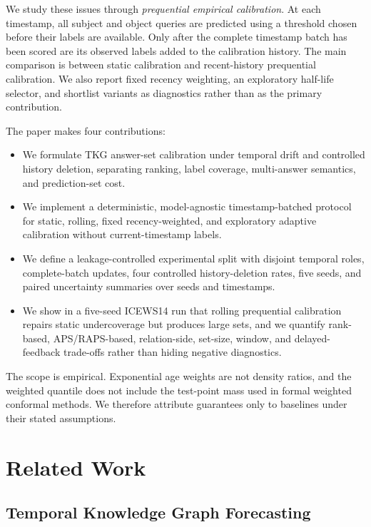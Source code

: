 \documentclass[10pt,twocolumn]{article}
\begin{document}
We study these issues through \emph{prequential empirical calibration}. At each
timestamp, all subject and object queries are predicted using a threshold chosen
before their labels are available. Only after the complete timestamp batch has
been scored are its observed labels added to the calibration history. The main
comparison is between static calibration and recent-history prequential
calibration. We also report fixed recency weighting, an exploratory half-life
selector, and shortlist variants as diagnostics rather than as the primary
contribution.

The paper makes four contributions:
\begin{itemize}[leftmargin=*]
  \item We formulate TKG answer-set calibration under temporal drift and
  controlled history deletion, separating ranking, label coverage,
  multi-answer semantics, and prediction-set cost.
  \item We implement a deterministic, model-agnostic timestamp-batched protocol
  for static, rolling, fixed recency-weighted, and exploratory adaptive
  calibration without current-timestamp labels.
  \item We define a leakage-controlled experimental split with disjoint temporal
  roles, complete-batch updates, four controlled history-deletion rates, five
  seeds, and paired uncertainty summaries over seeds and timestamps.
  \item We show in a five-seed ICEWS14 run that rolling prequential calibration
  repairs static undercoverage but produces large sets, and we quantify
  rank-based, APS/RAPS-based, relation-side, set-size, window, and
  delayed-feedback trade-offs rather than hiding negative diagnostics.
\end{itemize}

The scope is empirical. Exponential age weights are not density ratios, and the
weighted quantile does not include the test-point mass used in formal weighted
conformal methods. We therefore attribute guarantees only to baselines under
their stated assumptions.

\section{Related Work}
\label{sec:related}

\subsection{Temporal Knowledge Graph Forecasting}
\end{document}
